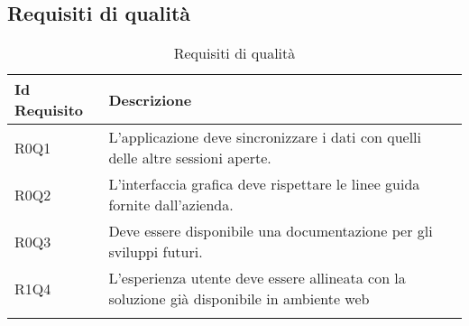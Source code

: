 \subsection{Requisiti di qualità}
\begin{longtable}{|C{3cm}|C{10cm}|}
	\hline
	\textbf{Id Requisito} & \textbf{Descrizione}\\
	\hline
	\endhead
	R0Q1 & L'applicazione deve sincronizzare i dati con quelli delle altre sessioni aperte.  \\ \hline 
	R0Q2 & L'interfaccia grafica deve rispettare le linee guida fornite dall'azienda.  \\ \hline 
	R0Q3 & Deve essere disponibile una documentazione per gli sviluppi futuri.  \\ \hline 
	R1Q4 & L'esperienza utente deve essere allineata con la soluzione già disponibile in ambiente web \\ \hline 
	\caption{Requisiti di qualità}
	\label{tabella:reqQ}
\end{longtable}

